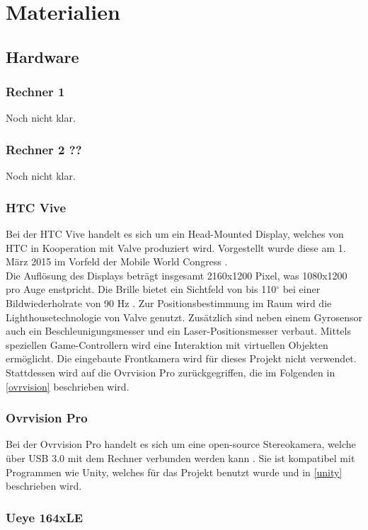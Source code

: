 \section{Materialien}
\subsection{Hardware}
\subsubsection{Rechner 1} \contentsline  {}
Noch nicht klar.
\subsubsection{Rechner 2 ??} 
Noch nicht klar.
\subsubsection{HTC Vive}
Bei der HTC Vive handelt es sich um ein Head-Mounted Display, welches von HTC in Kooperation mit Valve \cite{website:Valve} produziert wird. Vorgestellt wurde diese am 1. März 2015 im Vorfeld der Mobile World Congress \cite{website:mobileworldcongress}.\\
Die Auflösung des Displays beträgt insgesamt 2160x1200 Pixel, was 1080x1200 pro Auge enstpricht. Die Brille bietet ein Sichtfeld von bis 110$^\circ$ bei einer Bildwiederholrate von 90 Hz \cite{website:HTC_Vive}. Zur Positionsbestimmung im Raum wird die  Lighthousetechnologie von Valve genutzt. Zusätzlich sind neben einem Gyrosensor auch ein Beschleunigungsmesser und ein Laser-Positionsmesser verbaut. Mittels speziellen Game-Controllern wird eine Interaktion mit virtuellen Objekten ermöglicht. Die eingebaute Frontkamera wird für dieses Projekt nicht verwendet. Stattdessen wird auf die Ovrvision Pro zurückgegriffen, die im Folgenden in \ref{ovrvision} beschrieben wird.

\subsubsection{Ovrvision Pro \label{ovrvision}}
Bei der Ovrvision Pro handelt es sich um eine open-source Stereokamera, welche über USB 3.0 mit dem Rechner verbunden werden kann \cite{website:ovrvision}. Sie ist kompatibel mit Programmen wie Unity, welches für das Projekt benutzt wurde und in \ref{unity} beschrieben wird. 



\subsubsection{Ueye 164xLE}


